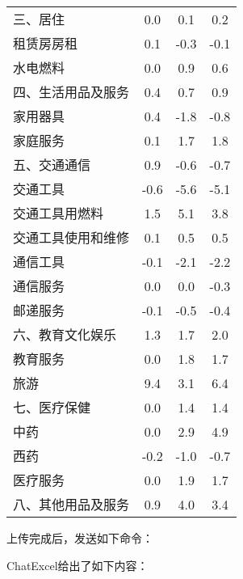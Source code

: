 \begin{table}[h]
\begin{tabular}{lccc}
        三、居住 & 0.0 & 0.1 & 0.2 \\[-3pt]
        租赁房房租 & 0.1 & -0.3 & -0.1 \\[-3pt]
        水电燃料 & 0.0 & 0.9 & 0.6 \\[-3pt]
        \midrule
        四、生活用品及服务 & 0.4 & 0.7 & 0.9 \\[-3pt]
        家用器具 & 0.4 & -1.8 & -0.8 \\[-3pt]
        家庭服务 & 0.1 & 1.7 & 1.8 \\[-3pt]
        \midrule
        五、交通通信 & 0.9 & -0.6 & -0.7 \\[-3pt]
        交通工具 & -0.6 & -5.6 & -5.1 \\[-3pt]
        交通工具用燃料 & 1.5 & 5.1 & 3.8 \\[-3pt]
        交通工具使用和维修 & 0.1 & 0.5 & 0.5 \\[-3pt]
        通信工具 & -0.1 & -2.1 & -2.2 \\[-3pt]
        通信服务 & 0.0 & 0.0 & -0.3 \\[-3pt]
        邮递服务 & -0.1 & -0.5 & -0.4 \\[-3pt]
        \midrule
        六、教育文化娱乐 & 1.3 & 1.7 & 2.0 \\[-3pt]
        教育服务 & 0.0 & 1.8 & 1.7 \\[-3pt]
        旅游 & 9.4 & 3.1 & 6.4 \\[-3pt]
        \midrule
        七、医疗保健 & 0.0 & 1.4 & 1.4 \\[-3pt]
        中药 & 0.0 & 2.9 & 4.9 \\[-3pt]
        西药 & -0.2 & -1.0 & -0.7 \\[-3pt]
        医疗服务 & 0.0 & 1.9 & 1.7 \\[-3pt]
        \midrule
        八、其他用品及服务 & 0.9 & 4.0 & 3.4 \\[-3pt]
        \bottomrule
    \end{tabular}
    \label{tab:1-7}
\end{table}
\FloatBarrier

上传完成后，发送如下命令：


ChatExcel给出了如下内容：


